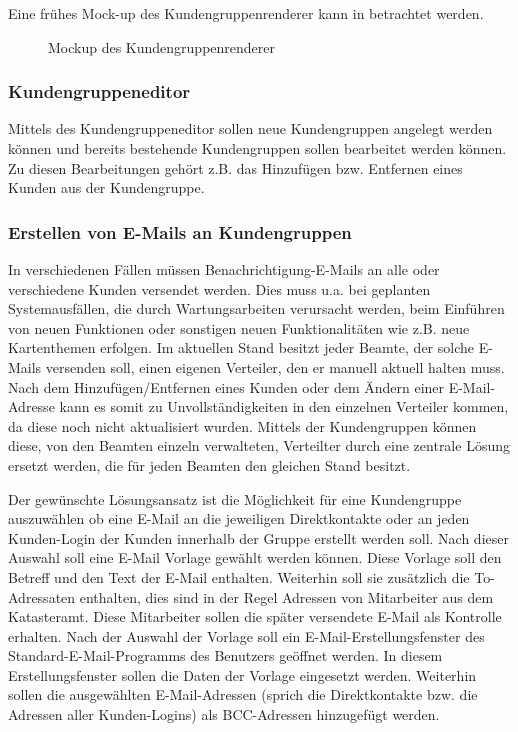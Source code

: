 Eine frühes Mock-up des Kundengruppenrenderer kann in  betrachtet werden.
\begin{figure}[htb]
	\centering
	\caption{Mockup des Kundengruppenrenderer}
	\label{fig:mockup-kundengruppenrenderer}
\end{figure}

\subsubsection{Kundengruppeneditor}
Mittels des Kundengruppeneditor sollen neue Kundengruppen angelegt werden können und bereits bestehende Kundengruppen sollen bearbeitet werden können. Zu diesen Bearbeitungen gehört z.B. das Hinzufügen bzw. Entfernen eines Kunden aus der Kundengruppe.

\subsubsection{Erstellen von E-Mails an Kundengruppen}
In verschiedenen Fällen müssen Benachrichtigung-E-Mails an alle oder verschiedene Kunden versendet werden.
Dies muss u.a. bei geplanten Systemausfällen, die durch Wartungsarbeiten verursacht werden, beim Einführen von neuen Funktionen oder sonstigen neuen Funktionalitäten wie z.B. neue Kartenthemen erfolgen.
Im aktuellen Stand besitzt jeder Beamte, der solche E-Mails versenden soll, einen eigenen Verteiler, den er manuell aktuell halten muss.
Nach dem Hinzufügen/Entfernen eines Kunden oder dem Ändern einer E-Mail-Adresse kann es somit zu Unvollständigkeiten in den einzelnen Verteiler kommen, da diese noch nicht aktualisiert wurden.
Mittels der Kundengruppen können diese, von den Beamten einzeln verwalteten, Verteilter durch eine zentrale Lösung ersetzt werden, die für jeden Beamten den gleichen Stand besitzt.

Der gewünschte Lösungsansatz ist die Möglichkeit für eine Kundengruppe auszuwählen ob eine E-Mail an die jeweiligen Direktkontakte oder an jeden Kunden-Login der Kunden innerhalb der Gruppe erstellt werden soll.
Nach dieser Auswahl soll eine E-Mail Vorlage gewählt werden können. Diese Vorlage soll den Betreff und den Text der E-Mail enthalten.
Weiterhin soll sie zusätzlich die To-Adressaten enthalten, dies sind in der Regel Adressen von Mitarbeiter aus dem Katasteramt.
Diese Mitarbeiter sollen die später versendete E-Mail als Kontrolle erhalten. 
Nach der Auswahl der Vorlage soll ein E-Mail-Erstellungsfenster des Standard-E-Mail-Programms des Benutzers geöffnet werden.
In diesem Erstellungsfenster sollen die Daten der Vorlage eingesetzt werden. Weiterhin sollen die ausgewählten E-Mail-Adressen (sprich die Direktkontakte bzw. die Adressen aller Kunden-Logins) als BCC-Adressen hinzugefügt werden.

